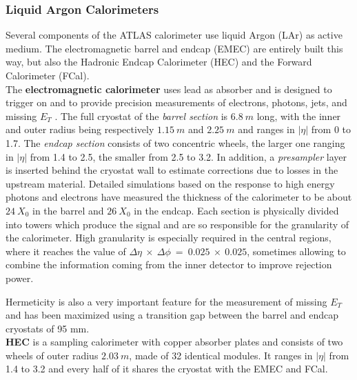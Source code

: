 \documentclass[a4paper,twoside,12pt]{article}
\begin{document}
\subsubsection*{Liquid Argon Calorimeters}\label{sec:LAr}
Several components of the ATLAS calorimeter use liquid Argon (LAr) as active medium\cite{current_EMCal}. The electromagnetic barrel and endcap (EMEC) are entirely built this way, but also the Hadronic Endcap Calorimeter (HEC) and the Forward Calorimeter (FCal). \\[2pt]
The \textbf{electromagnetic calorimeter} uses lead as absorber and is designed to trigger on and to provide precision measurements of electrons, photons, jets, and missing $E_T$ .
The full cryostat of the \textit{barrel section} is $6.8\ m$ long, with the inner and outer radius being respectively $1.15\ m$ and $2.25\ m$ and ranges in $|\eta|$ from 0 to 1.7.  The \textit{endcap section} consists of two concentric wheels, the larger one ranging in $|\eta|$ from 1.4 to 2.5, the smaller from 2.5 to 3.2. In addition, a \textit{presampler} layer is inserted behind the cryostat wall to estimate corrections due to losses in the upstream material. 
Detailed simulations based on the response to high energy photons and electrons have
measured the thickness of the calorimeter to be about $24\ X_0$ in the barrel and $26\ X_0$ in the endcap. Each section is physically divided into towers which produce the signal and are so responsible
for the granularity of the calorimeter.
High granularity is especially required in the central regions, where it reaches the value of 
$\Delta\eta\ \times\ \Delta\phi\ =\ 0.025\ \times\ 0.025$, sometimes allowing to combine the information
coming from the inner detector to improve rejection power.

Hermeticity is also a very important feature for the measurement of missing $E_T$ and has been maximized using a transition gap between the barrel and endcap cryostats of 95 mm. \\

\textbf{HEC}\cite{hec} is a sampling calorimeter with copper absorber plates and consists of two wheels of outer radius $2.03\ m$, made of 32 identical modules. It ranges in $|\eta|$ from 1.4 to 3.2 and every half of it shares the cryostat with the EMEC and FCal. \\[2pt]
\end{document}
